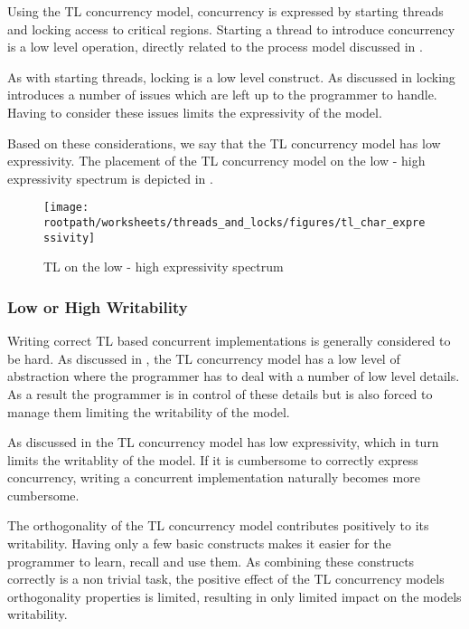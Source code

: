 Using the \ac{TL} concurrency model, concurrency is expressed by starting threads and locking access to critical regions. Starting a thread to introduce concurrency is a low level operation, directly related to the process model discussed in .

As with starting threads, locking is a low level construct. As discussed in  locking introduces a number of issues which are left up to the programmer to handle. Having to consider these issues limits the expressivity of the model.

Based on these considerations, we say that the \ac{TL} concurrency model has low expressivity. The placement of the \ac{TL} concurrency model on the low - high expressivity spectrum is depicted in .

\begin{figure}[htbp]
\centering
 \texttt{[image: \\rootpath/worksheets/threads\_and\_locks/figures/tl\_char\_expressivity]} 
 \caption{\ac{TL} on the low - high expressivity spectrum}
\label{fig:char_tl_expressivity}
\end{figure}

\subsubsection{Low or High Writability}
Writing correct \ac{TL} based concurrent implementations is generally considered to be hard\cite[p. 56]{sutter2005software}. As discussed in , the \ac{TL} concurrency model has a low level of abstraction where the programmer has to deal with a number of low level details. As a result the programmer is in control of these details but is also forced to manage them limiting the writability of the model.

As discussed in  the \ac{TL} concurrency model has low expressivity, which in turn limits the writablity of the model. If it is cumbersome to correctly express concurrency, writing a concurrent implementation naturally becomes more cumbersome.

The orthogonality of the \ac{TL} concurrency model contributes positively to its writability. Having only a few basic constructs makes it easier for the programmer to learn, recall and use them. As combining these constructs correctly is a non trivial task, the positive effect of the \ac{TL} concurrency models orthogonality properties is limited, resulting in only limited impact on the models writability.

